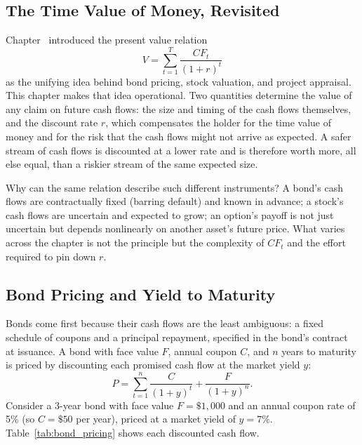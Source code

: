 \documentclass[../ai_in_finance]{subfiles}
\begin{document}
\subsection{The Time Value of Money, Revisited}

Chapter~ introduced the present value relation
$$V = \sum_{t=1}^{T} \frac{CF_t}{(1+r)^t}$$
as the unifying idea behind bond pricing, stock valuation, and project appraisal. This chapter makes that idea operational. Two quantities determine the value of any claim on future cash flows: the size and timing of the cash flows themselves, and the discount rate $r$, which compensates the holder for the time value of money and for the risk that the cash flows might not arrive as expected. A safer stream of cash flows is discounted at a lower rate and is therefore worth more, all else equal, than a riskier stream of the same expected size.

Why can the same relation describe such different instruments? A bond's cash flows are contractually fixed (barring default) and known in advance; a stock's cash flows are uncertain and expected to grow; an option's payoff is not just uncertain but depends nonlinearly on another asset's future price. What varies across the chapter is not the principle but the complexity of $CF_t$ and the effort required to pin down $r$.

\subsection{Bond Pricing and Yield to Maturity}
\label{sec:valuation-bond-pricing}

Bonds come first because their cash flows are the least ambiguous: a fixed schedule of coupons and a principal repayment, specified in the bond's contract at issuance. A bond with face value $F$, annual coupon $C$, and $n$ years to maturity is priced by discounting each promised cash flow at the market yield $y$:
\begin{equation}
P = \sum_{t=1}^{n} \frac{C}{(1+y)^t} + \frac{F}{(1+y)^n}.\label{eq:valuation-bond-price}
\end{equation}
Consider a 3-year bond with face value $F = \$1{,}000$ and an annual coupon rate of 5\% (so $C = \$50$ per year), priced at a market yield of $y = 7\%$. Table~\ref{tab:bond_pricing} shows each discounted cash flow.
\end{document}
